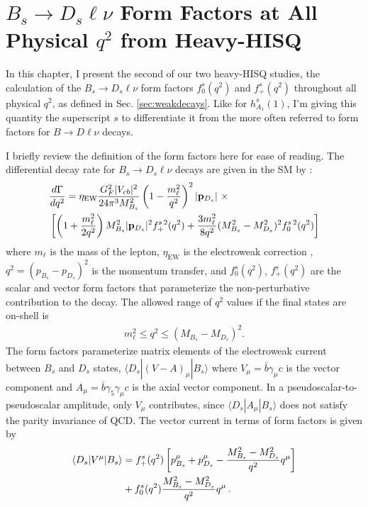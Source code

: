 ﻿﻿\chapter{$B_s\to D_s\ell\nu$ Form Factors at All Physical $q^2$ from Heavy-HISQ}
\label{chap:BsDs}

In this chapter, I present the second of our two heavy-HISQ studies, the calculation of the $B_s\to D_s\ell\nu$ form factors $f^s_0(q^2)$ and $f^s_+(q^2)$ throughout all physical $q^2$, as defined in Sec. \ref{sec:weakdecays}. Like for $h_{A_1}^s(1)$, I'm giving this quantity the superscript $s$ to differentiate it from the more often referred to form factors for $B\to D\ell\nu$ decays.

I briefly review the definition of the form factors here for ease of reading. The differential decay rate for $B_s\to D_s \ell \nu$ decays are given in the SM by \cite{PhysRevD.98.030001}:
\begin{align}
  &{d\Gamma\over dq^2} = \eta_{\text{EW}} { G_F^2 |V_{cb}|^2\over 24 \pi^3 M_{B_s}^2 } \left( 1 - {m_{\ell}^2\over q^2}\right)^2 |{\bf{p}}_{D_s}| \,\,\times \\
  \label{eq:branchingfraction}
  &\left[ \left( 1 + {m_{\ell}^2\over 2q^2}\right) M_{B_s}^2 |{\bf{p}}_{D_s}|^2 f_+^{s\,2}(q^2) + {3m_{\ell}^2\over 8q^2} (M_{B_s}^2-M_{D_s}^2)^2 f_0^{s\,2}(q^2) \right] \nonumber
\end{align}
where $m_{\ell}$ is the mass of the lepton, $\eta_{\text{EW}}$ is the electroweak correction \cite{SIRLIN198283,Ginsberg1968,PhysRevD.41.1736}, $q^2 = (p_{B_s} - p_{D_s})^2$ is the momentum transfer, and $f_0^s(q^2)$, $f_+^s(q^2)$ are the scalar and vector form factors that parameterize the non-perturbative contribution to the decay. The allowed range of $q^2$ values if the final states are on-shell is
\begin{align}
  m_{\ell}^2 \leq q^2 \leq (M_{B_s}-M_{D_s})^2.
\end{align}
The form factors parameterize matrix elements of the electroweak current between $B_s$ and $D_s$ states, $\langle D_s | (V-A)_{\mu} | B_s \rangle$ where $V_{\mu}=\bar{b}\gamma_{\mu}c$ is the vector component and $A_{\mu}=\bar{b}\gamma_5\gamma_{\mu} c$ is the axial vector component. In a pseudoscalar-to-pseudoscalar amplitude, only $V_{\mu}$ contributes, since $\langle D_s | A_{\mu} | B_s \rangle$ does not satisfy the parity invariance of QCD. The vector current in terms of form factors is given by
\begin{align}
  \langle D_s | V^{\mu} | B_s \rangle &= f_+^s(q^2) \left[ p_{B_s}^{\mu} + p_{D_s}^{\mu} - {M_{B_s}^2 - M_{D_s}^2 \over q^2} q^{\mu} \right] \nonumber \\
  &+ f_0^s(q^2) { M_{B_s}^2 - M_{D_s}^2 \over q^2} q^{\mu}\,.
  \label{eq:vectorcurrent}
\end{align}

